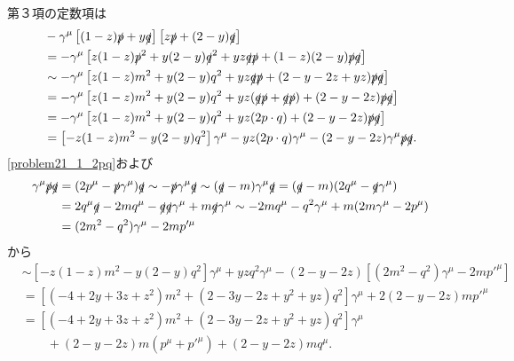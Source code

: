 第３項の定数項は
\begin{align*}
  & - \gamma^\mu \left[ (1-z) \slashed{p} + y \slashed{q} \right] \left[ z \slashed{p} + (2-y) \slashed{q} \right] \\
  &= - \gamma^\mu \left[ z(1-z) \slashed{p}^2+ y(2-y) \slashed{q}^2 + yz \slashed{q}\slashed{p} + (1-z)(2-y) \slashed{p}\slashed{q} \right] \\
  &\sim - \gamma^\mu \left[ z(1-z) m^2 + y(2-y) q^2 + yz \slashed{q}\slashed{p} + (2-y-2z+yz) \slashed{p}\slashed{q} \right] \\
  &= - \gamma^\mu \left[ z(1-z) m^2 + y(2-y) q^2 + yz (\slashed{q}\slashed{p}+\slashed{q}\slashed{p}) + (2-y-2z) \slashed{p}\slashed{q} \right] \\
  &= - \gamma^\mu \left[ z(1-z) m^2 + y(2-y) q^2 + yz (2 p\cdot q) + (2-y-2z) \slashed{p}\slashed{q} \right] \\
  &= \left[ -z(1-z)m^2 - y(2-y) q^2 \right] \gamma^\mu - yz (2p\cdot q) \gamma^\mu - (2-y-2z) \gamma^\mu\slashed{p}\slashed{q} .
\end{align*}
\eqref{problem21_1_2pq}および
\begin{align*}
  \gamma^\mu\slashed{p}\slashed{q} &= (2p^\mu - \slashed{p} \gamma^\mu) \slashed{q}
  \sim - \slashed{p} \gamma^\mu \slashed{q} \sim (\slashed{q}-m) \gamma^\mu \slashed{q}
  = (\slashed{q}-m) (2q^\mu - \slashed{q} \gamma^\mu ) \\
  &= 2q^\mu\slashed{q} - 2mq^\mu - \slashed{q}\slashed{q}\gamma^\mu + m \slashed{q}\gamma^\mu
  \sim -2mq^\mu - q^2\gamma^\mu + m(2m\gamma^\mu - 2p^\mu) \\
  &= (2m^2-q^2) \gamma^\mu - 2mp'^\mu
\end{align*}
から
\begin{align*}
  &\sim \left[ -z(1-z)m^2 - y(2-y) q^2 \right] \gamma^\mu + yzq^2 \gamma^\mu - (2-y-2z) [(2m^2-q^2) \gamma^\mu - 2mp'^\mu] \\
  &= \left[ (-4+2y+3z+z^2)m^2 + (2-3y-2z+y^2+yz)q^2 \right] \gamma^\mu + 2(2-y-2z)m p'^\mu \\
  &= \left[ (-4+2y+3z+z^2)m^2 + (2-3y-2z+y^2+yz)q^2 \right] \gamma^\mu \\
  &\qquad + (2-y-2z)m (p^\mu+p'^\mu) + (2-y-2z)m q^\mu .
\end{align*}

